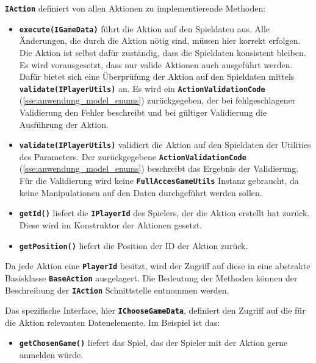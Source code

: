 \documentclass[
							a4paper, 
							11pt, 
							openany, 
							liststotoc,
							parskip=half, 
   							headings=normal
						]{scrreprt}
\begin{document}
{\textbf{\texttt{IAction}} definiert von allen Aktionen zu implementierende Methoden:
\begin{itemize}
	\item \textbf{\texttt{execute(IGameData)}} führt die Aktion auf den Spieldaten aus. Alle Änderungen, die durch die Aktion nötig sind, müssen hier korrekt erfolgen. Die Aktion ist selbst dafür zuständig, dass die Spieldaten konsistent bleiben. Es wird vorausgesetzt, dass nur valide Aktionen auch ausgeführt werden. Dafür bietet sich eine Überprüfung der Aktion auf den Spieldaten mittels \textbf{\texttt{va\-li\-date(IPla\-yer\-Utils)}} an. Es wird ein \textbf{\texttt{ActionValidationCode}} (\autoref{sse:anwendung_model_enums}) zu\-rück\-ge\-ge\-ben, der bei fehlgeschlagener Validierung den Fehler beschreibt und bei gültiger Validierung die Ausführung der Aktion.
	\item \textbf{\texttt{validate(IPlayerUtils)}} validiert die Aktion auf den Spieldaten der Utilities des Parameters. Der zurückgegebene \textbf{\texttt{ActionValidationCode}} (\autoref{sse:anwendung_model_enums}) beschreibt das Ergebnis der Validierung. Für die Validierung wird keine \textbf{\texttt{Full\-Ac\-ces\-Ga\-me\-Ut\-ils}} Instanz gebraucht, da keine Manipulationen auf den Daten durchgeführt werden sollen.
	\item \textbf{\texttt{getId()}} liefert die \textbf{\texttt{IPlayerId}} des Spielers, der die Aktion erstellt hat zurück. Diese wird im Konstruktor der Aktionen gesetzt.
	\item \textbf{\texttt{getPosition()}} liefert die Position der ID der Aktion zurück. 
\end{itemize}\bigskip

Da jede Aktion eine \textbf{\texttt{PlayerId}} besitzt, wird der Zugriff auf diese in eine abstrakte Basisklasse \textbf{\texttt{BaseAction}} ausgelagert. Die Bedeutung der Methoden können der Beschreibung der \textbf{\texttt{IAction}} Schnittstelle entnommen werden.

Das spezifische Interface, hier \textbf{\texttt{IChooseGameData}}, definiert den Zugriff auf die für die Aktion relevanten Datenelemente. Im Beispiel ist das:

\begin{itemize}
	\item \textbf{\texttt{getChosenGame()}} liefert das Spiel, das der Spieler mit der Aktion gerne anmelden würde.
\end{itemize}\bigskip

}
\end{document}
